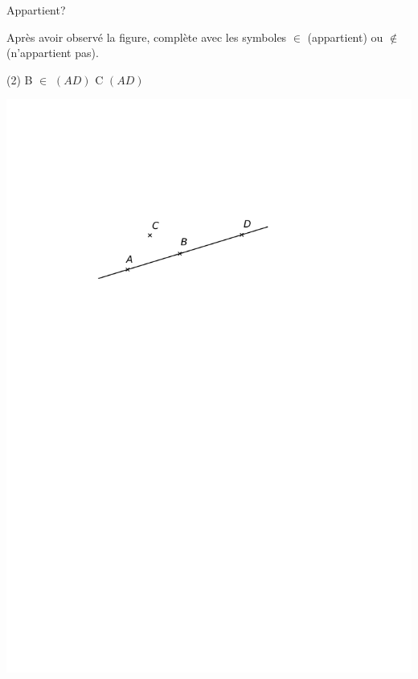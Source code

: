 \documentclass[a4paper,11pt]{report}
\begin{document}
\begin{resolu}{Appartient?}{Après avoir observé la figure, complète avec les symboles $\in$ (appartient) ou $\notin$ (n'appartient pas).
\begin{tasks}(2)
    \task B \underline{\hspace{0.1cm} {\color{blue} $\in$}\hspace{0.1cm}} $(AD)$ 
    \task C \underline{\hspace{0.1cm}{\color{blue} $\notin$}\hspace{0.1cm}} $(AD)$
\end{tasks}
\begin{center}
	\includegraphics[scale=0.8]{media/es-11/13-r3}
\end{center}
}
\end{resolu}
\end{document}
